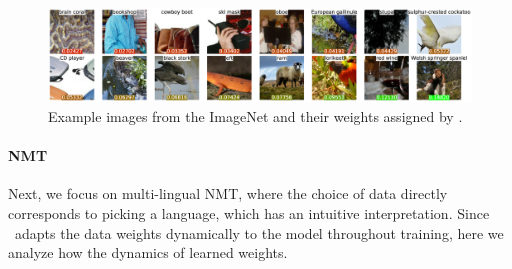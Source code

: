 \begin{figure}
    \centering
    \includegraphics[width=\textwidth]{figs/imagenet_dds.eps}
  \caption{\label{fig:dds_score} Example images from the ImageNet and their weights assigned by \dds. }
\end{figure}

\paragraph{NMT}
Next, we focus on multi-lingual NMT, where the choice of data directly corresponds to picking a language, which has an intuitive interpretation. Since \dds~adapts the data weights dynamically to the model throughout training, here we analyze how the dynamics of learned weights.


